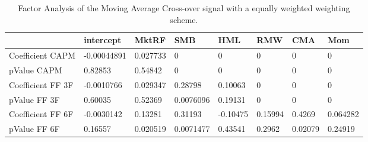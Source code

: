 \begin{table}[H]
\centering
\begin{tabular}{llllllll}
& intercept & MktRF & SMB & HML & RMW & CMA & Mom \\ 
\hline 
Coefficient CAPM & -0.00044891 & 0.027733 & 0 & 0 & 0 & 0 & 0 \\ 
pValue CAPM & 0.82853 & 0.54842 & 0 & 0 & 0 & 0 & 0 \\ 
Coefficient FF 3F & -0.0010766 & 0.029347 & 0.28798 & 0.10063 & 0 & 0 & 0 \\ 
pValue FF 3F & 0.60035 & 0.52369 & 0.0076096 & 0.19131 & 0 & 0 & 0 \\ 
Coefficient FF 6F & -0.0030142 & 0.13281 & 0.31193 & -0.10475 & 0.15994 & 0.4269 & 0.064282 \\ 
pValue FF 6F & 0.16557 & 0.020519 & 0.0071477 & 0.43541 & 0.2962 & 0.02079 & 0.24919 \\ 
\hline
\end{tabular}
\caption{Factor Analysis of the Moving Average Cross-over signal with a equally weighted weighting scheme.}
\label{MAEW_FACTOR}
\end{table}
